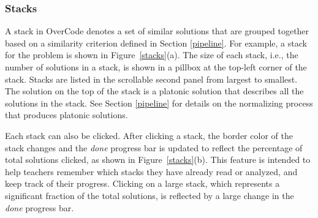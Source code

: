 \subsubsection{Stacks} A stack in OverCode denotes a set of similar solutions that are grouped together based on a similarity criterion defined in Section \ref{pipeline}. For example, a stack for the  problem is shown in Figure~\ref{stacks}(a). The size of each stack, i.e., the number of solutions in a stack, is shown in a pillbox at the top-left corner of the stack. Stacks are listed in the scrollable second panel from largest to smallest. The solution on the top of the stack is a platonic solution that describes all the solutions in the stack. See Section \ref{pipeline} for details on the normalizing process that produces platonic solutions.

Each stack can also be clicked. After clicking a stack, the border color of the stack changes and the \emph{done} progress bar is updated to reflect the percentage of total solutions clicked, as shown in Figure~\ref{stacks}(b). This feature is intended to help teachers remember which stacks they have already read or analyzed, and keep track of their progress. Clicking on a large stack, which represents a significant fraction of the total solutions, is reflected by a large change in the \emph{done} progress bar. 

